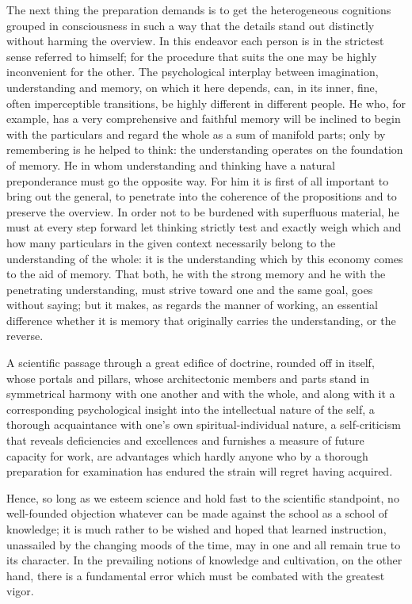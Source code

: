\documentclass[12pt,a4paper,openany]{book}
\newcommand{\opage}[1]{\marginnote{\footnotesize\textit{[#1]}}}
\begin{document}
The next thing the preparation demands is to get the
heterogeneous cognitions grouped in consciousness in such a way
that the details stand out distinctly without harming
the overview. In this endeavor each person is in the
strictest sense referred to himself; for the procedure
that suits the one may be highly
inconvenient for the other. The psychological interplay
between imagination, understanding and memory, on which
it here depends, can, in its inner, fine, often imperceptible
transitions, be highly different in different people.
He who, for example, has a very comprehensive and faithful memory
will be inclined to begin with the particulars and
regard the whole as a sum of manifold parts; only
by remembering is he helped to think: the understanding operates
on the foundation of memory. He in whom understanding
and thinking have a natural preponderance must go the
opposite way. For him it is first of all important to
bring out the general, to penetrate into the coherence of the propositions
and to preserve the overview. In order not to be burdened
with superfluous material, he must at every step
forward let thinking strictly test and exactly weigh
which and how many particulars in the given
context necessarily belong to the understanding of
the whole: it is the understanding which by this economy
comes to the aid of memory. That both, he
with the strong memory and he with the penetrating
understanding, must strive toward one and the same goal,
goes without saying; but it makes, as
\setcounter{footnote}{0}%
\opage{304}regards the manner of working, an essential difference whether it is memory
that originally carries the understanding, or the reverse.

A scientific passage through a great edifice of doctrine, rounded off in
itself, whose portals and pillars, whose architectonic
members and parts stand in symmetrical harmony with
one another and with the whole, and along with it a corresponding
psychological insight into the intellectual nature of the self,
a thorough acquaintance with one's own spiritual-individual
nature, a self-criticism that reveals deficiencies and
excellences and furnishes a measure of future capacity for work,
are advantages which hardly anyone who by a thorough
preparation for examination has endured the strain
will regret having acquired.

Hence, so long as we esteem science and hold fast to
the scientific standpoint, no well-founded
objection whatever can be made against the school as a school of knowledge;
it is much rather to be wished and hoped that
learned instruction, unassailed by the changing
moods of the time, may in one and all remain true to its character.
In the prevailing notions of knowledge
and cultivation, on the other hand, there is a fundamental error which must be
combated with the greatest vigor.
\end{document}
